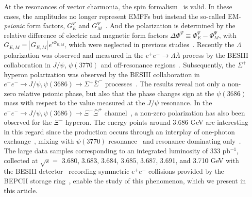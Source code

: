 \documentclass[a4paper,11pt]{article}
\begin{document}
At the resonances of vector charmonia, the spin formalism~\cite{Faldt:2017kgy} is valid. In these cases, the amplitudes no longer represent EMFFs but instead the so-called EM-\textit{psionic} form factors, $G^{\Psi}_E$ and $G^{\Psi}_M$~\cite{BESIII:2021cvv}. And the polarization is determined by the relative difference of electric and magnetic form factors $\Delta\Phi^{\Psi} \equiv \Phi^{\Psi}_{E} - \Phi^{\Psi}_{M}$, {with $G_{E,M}=\left|G_{E,M}\right|e^{i\Phi_{E,M}}$}, which were neglected in previous studies~\cite{BESIII:2019cuv, Ablikim:2016iym, Ablikim:2016iym-01, Ablikim:2016iym-02, Ablikim:2016iym-03, BESIII:2020ktn, BESIII:2021aer, Wang:2018kdh, Wang:2021lfq,
BESIII:2022mfx}. Recently the $\Lambda$ polarization was observed and measured in the $e^+e^- \to \Lambda\bar\Lambda$ process by the BESIII collaboration in $J/\psi$, $\psi(3770)$ and off-resonance regions~\cite{Ablikim:2018zay, BESIII:2021cvv, BESIII:2022yprl, BESIII:2019nep}.
Subsequently, the $\Sigma^+$ hyperon polarization was observed by the BESIII collaboration in $e^+e^-\to J/\psi, \psi(3686)\to\Sigma^+\bar{\Sigma}^-$ processes~\cite{yanliang}. The results reveal not only  a non-zero relative psionic phase, but also that the phase changes sign at the $\psi(3686)$ mass with respect to the value measured at the $J/\psi$ resonance. In the $e^+e^-\to J/\psi,\psi(3686)\to\Xi^-\bar\Xi^+$ channel~\cite{BESIII:2021ypr,BESIII:2022_xi_psip, BESIII:2023lkg}, a non-zero polarization has also been observed for the $\Xi^{-}$ hyperon.
The energy points around 3.686 GeV are interesting in this regard since the production occurs through an interplay of one-photon exchange~\cite{BESIII:2019nep}, mixing with $\psi(3770)$ resonance~\cite{BESIII:2021cvv} and resonance dominating only~\cite{Ablikim:2018zay,BESIII:2022yprl}.
The large data samples corresponding to an integrated luminosity of 333 pb$^{-1}$, collected at $\sqrt{s} =$ 3.680, 3.683, 3.684, 3.685, 3.687, 3.691, and 3.710 GeV with the BESIII detector~\cite{Ablikim:2009aa} recording symmetric $e^+e^-$ collisions provided by the BEPCII storage ring~\cite{Yu:IPAC2016-TUYA01}, enable the study of this phenomenon, which we present in this article.
\end{document}
